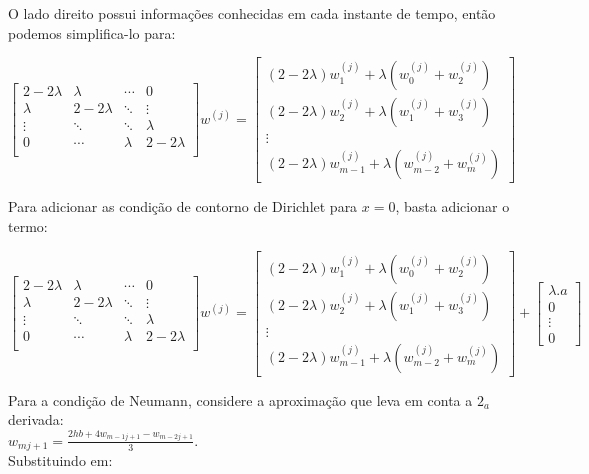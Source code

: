 \documentclass[11pt]{article}
\begin{document}
O lado direito possui informações conhecidas em cada instante de tempo, então podemos simplifica-lo para:

	\begin{equation}
	\begin{bmatrix}
	2-2\lambda & \lambda & \cdots & 0 \\
	\lambda & 2-2\lambda & \ddots & \vdots\\
	\vdots & \ddots & \ddots & \lambda\\
	0 & \cdots & \lambda & 2-2\lambda\\
	\end{bmatrix}w^{(j)} = 
	\begin{bmatrix}
	(2-2\lambda)w_1^{(j)} + \lambda(w_{0}^{(j)} + w_2^{(j)})\\
	(2-2\lambda)w_2^{(j)} + \lambda(w_{1}^{(j)} + w_3^{(j)})\\
	\vdots\\
	(2-2\lambda)w_{m-1}^{(j)} + \lambda(w_{m-2}^{(j)} + w_m^{(j)})
	\end{bmatrix}
	\end{equation}

Para adicionar as condição de contorno de Dirichlet para $x = 0$, basta adicionar o termo:

	\begin{equation}
	\begin{bmatrix}
	2-2\lambda & \lambda & \cdots & 0 \\
	\lambda & 2-2\lambda & \ddots & \vdots\\
	\vdots & \ddots & \ddots & \lambda\\
	0 & \cdots & \lambda & 2-2\lambda\\
	\end{bmatrix}w^{(j)} = 
	\begin{bmatrix}
	(2-2\lambda)w_1^{(j)} + \lambda(w_{0}^{(j)} + w_2^{(j)})\\
	(2-2\lambda)w_2^{(j)} + \lambda(w_{1}^{(j)} + w_3^{(j)})\\
	\vdots\\
	(2-2\lambda)w_{m-1}^{(j)} + \lambda(w_{m-2}^{(j)} + w_m^{(j)})
	\end{bmatrix} + 
	\begin{bmatrix}
	\lambda.a\\
	0\\
	\vdots\\
	0
	\end{bmatrix}
	\end{equation}

Para a condição de Neumann, considere a aproximação que leva em conta a $2_a$ derivada:\\$\displaystyle{w_{mj+1} = \frac{2hb + 4w_{m-1j+1} - w_{m-2j+1}}{3}}$.\\Substituindo em:
\end{document}
